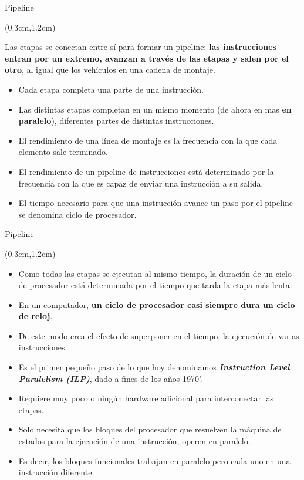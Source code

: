 \documentclass[table,dvipsnames,aspectratio=169]{beamer}
\begin{document}
\begin{frame}{Pipeline}
 \begin{textblock*}{\textwidth}(0.3cm,1.2cm)
  \begin{tcolorbox}[enhanced jigsaw,rounded corners, drop fuzzy shadow=ShadowColor]
   Las etapas se conectan entre sí para formar un pipeline: \textbf{\color{Blue}las instrucciones entran por un extremo, avanzan a través de las etapas y salen por el otro}, al igual que los vehículos en una cadena de montaje.
  \end{tcolorbox}
  \begin{itemize}[<+(1)->]\justifying
   \item Cada etapa completa una parte de una instrucción.
   \item Las distintas etapas completan en un mismo momento (de ahora en mas \textbf{\color{Blue}en paralelo}), diferentes partes de distintas instrucciones.
   \item El rendimiento de una línea de montaje es la frecuencia con la que cada elemento sale terminado.
   \item El rendimiento de un pipeline de instrucciones está determinado por la frecuencia con la que es capaz de enviar una instrucción a su salida.
   \item El tiempo necesario para que una instrucción avance un paso por el pipeline se denomina \textcolor{furfiBlue}{ciclo de procesador}.
  \end{itemize}
 \end{textblock*}
\end{frame}

\begin{frame}{Pipeline}
 \begin{textblock*}{\textwidth}(0.3cm,1.2cm)
  \begin{itemize}[<+->] \justifying
   \item Como todas las etapas se ejecutan al mismo tiempo, \textcolor{furfiBlue}{la duración de un ciclo de procesador está determinada por el tiempo que tarda la etapa más lenta}.
   \item En un computador, \textbf{\color{furfiGreen}un ciclo de procesador casi siempre dura un ciclo de reloj}.
   \item De este modo crea el efecto de superponer en el tiempo, la ejecución de varias instrucciones.
   \item Es el primer pequeño paso de lo que hoy denominamos \textit{\textbf{\color{blue}Instruction Level Paralelism (ILP)}}, dado a fines de los años 1970'.
   \item \textcolor{furfiBlue}{Requiere muy poco o ningún hardware adicional para interconectar las etapas.}
   \item Solo necesita que los bloques del procesador que resuelven la máquina de estados para la ejecución de una instrucción, operen en paralelo.
   \item Es decir, los bloques funcionales trabajan en paralelo pero cada uno en una instrucción diferente.
  \end{itemize}
 \end{textblock*}
\end{frame}
\end{document}
